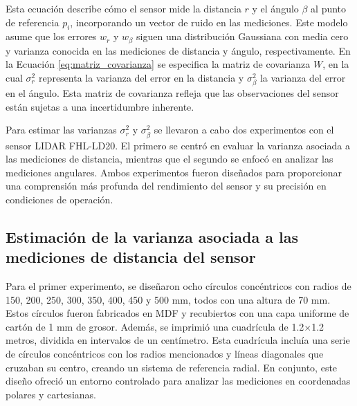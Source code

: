 Esta ecuación describe cómo el sensor mide la distancia $r$ y el ángulo $\beta$ al punto de referencia $p_i$, incorporando un vector de ruido en las mediciones. Este modelo asume que los errores $w_r$ y $w_\beta$ siguen  una distribución Gaussiana con media cero y varianza conocida en las mediciones de distancia y ángulo, respectivamente. En la Ecuación \ref{eq:matriz_covarianza} se especifica la matriz de covarianza $W$, en la cual $\sigma_r^2$ representa la varianza del error en la distancia y $\sigma_\beta^2$ la varianza del error en el ángulo. Esta matriz de covarianza refleja que las observaciones del sensor están sujetas a una incertidumbre inherente.

Para estimar las varianzas $\sigma_r^2$ y $\sigma_\beta^2$ se llevaron a cabo dos experimentos con el sensor LIDAR FHL-LD20.  El primero se centró en evaluar la varianza asociada a las mediciones de distancia, mientras que el segundo se enfocó en analizar las mediciones angulares. Ambos experimentos fueron diseñados para proporcionar una comprensión más profunda del rendimiento del sensor y su precisión en condiciones de operación.

\subsection{Estimación de la varianza asociada a las mediciones de distancia del sensor}
Para el primer experimento, se diseñaron ocho círculos concéntricos con radios de 150, 200, 250, 300, 350, 400, 450 y 500 mm, todos con una altura de 70 mm. Estos círculos fueron fabricados en MDF y recubiertos con una capa uniforme de cartón de 1 mm de grosor. Además, se imprimió una cuadrícula de 1.2$\times$1.2 metros, dividida en intervalos de un centímetro. Esta cuadrícula incluía una serie de círculos concéntricos con los radios mencionados y líneas diagonales que cruzaban su centro, creando un sistema de referencia radial. En conjunto, este diseño ofreció un entorno controlado para analizar las mediciones en coordenadas polares y cartesianas.

